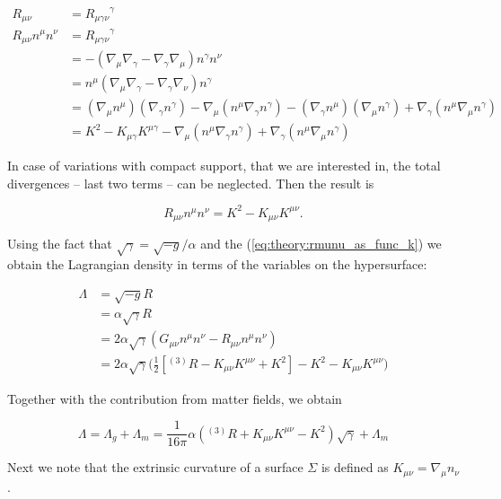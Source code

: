 \begin{align}
R_{\mu\nu} &= {R_{\mu\gamma\nu}}^{\gamma} \\
R_{\mu\nu}n^{\mu}n^{\nu} &= {R_{\mu\gamma\nu}}^{\gamma} \\
&= -(\nabla_{\mu}\nabla_{\gamma} - \nabla_{\gamma}\nabla_{\mu})n^{\gamma}n^{\nu} \\
&= n^{\mu}(\nabla_{\mu}\nabla_{\gamma} - \nabla_{\gamma}\nabla_{\nu})n^{\gamma} \\
&= (\nabla_{\mu}n^{\mu})(\nabla_{\gamma}n^{\gamma}) - \nabla_{\mu}(n^{\mu}\nabla_{\gamma}n^{\gamma}) - (\nabla_{\gamma}n^{\mu})(\nabla_{\mu}n^{\gamma}) + \nabla_{\gamma}(n^{\mu}\nabla_{\mu}n^{\gamma}) \\
&= K^2 - K_{\mu\gamma}K^{\mu\gamma} - \nabla_{\mu}(n^{\mu}\nabla_{\gamma}n^{\gamma}) + \nabla_{\gamma}(n^{\mu}\nabla_{\mu}n^{\gamma})
\end{align}

In case of variations with compact support, that we are interested in, the total divergences -- last two terms -- can be neglected. 
Then the result is

\begin{equation}
R_{\mu\nu}n^{\mu}n^{\nu}= K^2 - K_{\mu\nu}K^{\mu\nu}.
\label{eq:theory:rmunu_as_func_k}
\end{equation}


Using the fact that $\sqrt{\gamma}=\sqrt{-g}/\alpha$ and the (\ref{eq:theory:rmunu_as_func_k}) we obtain the Lagrangian density in terms of the variables on the hypersurface:

\begin{align}
\Lambda &= \sqrt{-g}R \\
&= \alpha\sqrt{\gamma}R \\
&= 2\alpha\sqrt{\gamma}(G_{\mu\nu}n^{\mu}n^{\nu} - R_{\mu\nu}n^{\mu}n^{\nu})\\ 
&= 2\alpha\sqrt{\gamma}\Big(\frac{1}{2}[{^{(3)}R} - K_{\mu\nu}K^{\mu\nu} + K^2] - K^2 - K_{\mu\nu}K^{\mu\nu}\Big)
\end{align}

Together with the contribution from matter fields, we obtain

\begin{equation}
\Lambda = \Lambda_g+\Lambda_m= \frac{1}{16\pi}\alpha({^{(3)}R} + K_{\mu\nu}K^{\mu\nu} - K^2)\sqrt{\gamma}+\Lambda_m
\end{equation}

Next we note that the extrinsic curvature of a
surface $\Sigma$ is defined as $K_{\mu\nu} = \nabla_{\mu}n_{\nu}$. 

